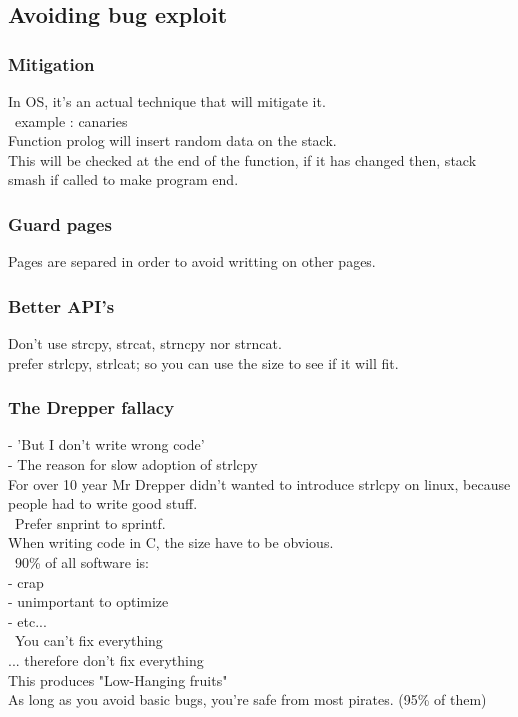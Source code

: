 \documentclass[a4paper,11pt]{article}
\begin{document}
\subsection{Avoiding bug exploit}
\subsubsection{Mitigation}
In OS, it's an actual technique that will mitigate it.\\
\
example : canaries\\
Function prolog will insert random data on the stack.\\
This will be checked at the end of the function, if it has changed then, stack smash if called to make program end.\\


\subsubsection{ Guard pages}

Pages are separed in order to avoid writting on other pages.


\subsubsection{ Better API's}

Don't use strcpy, strcat, strncpy nor strncat.\\
prefer strlcpy, strlcat; so you can use the size to see if it will fit.\\


\subsubsection{ The Drepper fallacy}
- 'But I don't write wrong code'\\
- The reason for slow adoption of strlcpy\\
For over 10 year Mr Drepper didn't wanted to introduce strlcpy on linux, because people had to write good stuff.\\
\
Prefer snprint to sprintf.\\
When writing code in C, the size have to be obvious.\\
\
90\% of all software is:\\
- crap\\
- unimportant to optimize\\
- etc...\\
\
You can't fix everything\\
... therefore don't fix everything\\
This produces "Low-Hanging fruits"\\
As long as you avoid basic bugs, you're safe from most pirates. (95\% of them)\\
\end{document}
